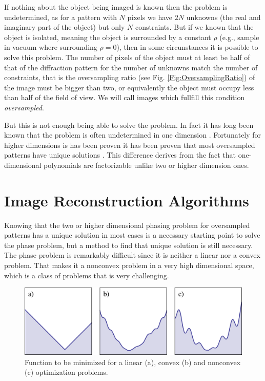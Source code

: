 If nothing about the object being imaged is known then the problem is
undetermined, as for a pattern with $N$ pixels we have $2N$ unknowns (the real and
imaginary part of the object) but only $N$ constraints. But if we known that the object is isolated, meaning the
object is surrounded by a constant $\rho$ (e.g., sample in vacuum where
surrounding $\rho = 0$), then in some circunstances it is possible to solve this
problem. The number of pixels of the object must at least be half of that of the
diffraction pattern for the number of unknowns match the number of
constraints, that is the oversampling ratio (see Fig. \ref{Fig:OversamplingRatio}) of the image must be bigger than
two, or equivalently the object must occupy less than half of the field of
view. We will call images which fullfill this condition {\em oversampled}.

But this is not enough being able to solve the problem. In fact it
has long been known that the problem is often undetermined in one dimension
\cite{Walther63}. Fortunately for higher dimensions is has been proven it has
been proven that most oversampled patterns have unique solutions
\cite{Bruck79}. This difference derives from the fact that one-dimensional
polynomials are factorizable unlike two or higher dimension ones.

\section{Image Reconstruction Algorithms}

Knowing that the two or higher dimensional phasing problem for oversampled
patterns has a unique solution in most cases is a necessary starting point to
solve the phase problem, but a method to find that unique solution is still
necessary. The phase problem is remarkably difficult since it is neither a
linear nor a convex problem. That makes it a nonconvex problem in a very high
dimensional space, which is a class of problems that is very challenging.

\begin{figure}[h]
  \centering
  \includegraphics[width=1 \columnwidth]{Image_Reconstruction/convexity.pdf}
  \caption{Function to be minimized for a linear (a), convex (b) and nonconvex
    (c) optimization problems.}
  \label{Fig:Convexity}
\end{figure}

